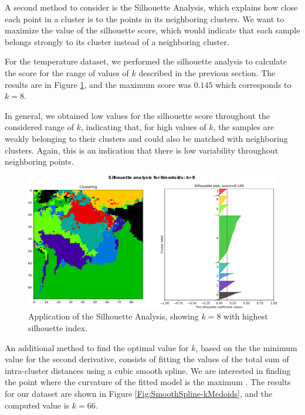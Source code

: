 A second method to consider is the Silhouette Analysis, which explains how close each point in a cluster is to the points in its neighboring clusters. We want to maximize the value of the silhouette score, which would indicate that each sample belongs strongly to its cluster instead of a neighboring cluster.

For the temperature dataset, we performed the silhouette analysis to calculate the score for the range of values of $k$ described in the previous section. The results are in Figure \ref{Fig:Silhouette-kMedoids}, and the maximum score was $0.145$ which corresponds to $k = 8$. 

In general, we obtained low values for the silhouette score throughout the considered range of $k$, indicating that, for high values of $k$, the samples are weakly belonging to their clusters and could also be matched with neighboring clusters. Again, this is an indication that there is low variability throughout neighboring points.

\begin{figure}[h]
	\centering
	\includegraphics[scale=0.50]{../Figures/silhouette-kmedoids_k8_seed0_lite}
	\caption{Application of the Silhouette Analysis, showing $k=8$ with highest silhouette index.}
	\label{Fig:Silhouette-kMedoids}
\end{figure}

An additional method to find the optimal value for $k$, based on the the minimum value for the second derivative, consists of fitting the values of the total sum of intra-cluster distances using a cubic smooth spline. We are interested in finding the point where the curvature of the fitted model is the maximum \cite{Akima1970}. The results for our dataset are shown in Figure \ref{Fig:SmoothSpline-kMedoids}, and the computed value is $k = 66$.

